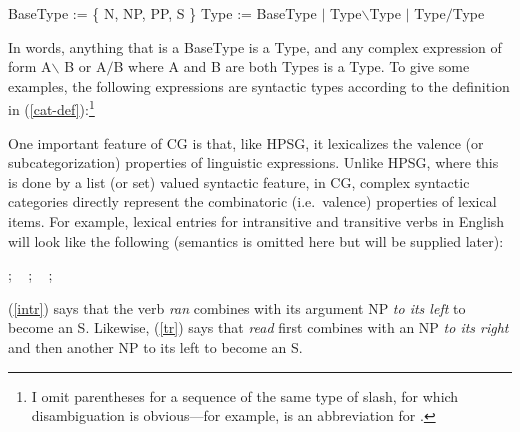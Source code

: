 \documentclass[output=paper]{langsci/langscibook}
\begin{document}
\begin{exe}
 \ex\label{cat-def}
  \begin{xlist}
 \ex\label{bascat}
    BaseType := \{ N,  NP, PP, S \}
 \ex\label{complex-cat}
    Type := BaseType $|$ Type\ensuremath{\backslash}Type $|$ Type\ensuremath{/}Type
  \end{xlist}
\end{exe}
In words, anything that is a BaseType is a Type, and
any complex expression of form A\ensuremath{\backslash} B  or A\ensuremath{/}B where A and B are both
Types is a Type. To give some examples, the following expressions are
syntactic types according to the definition in
(\ref{cat-def}):\footnote{I omit
parentheses for a sequence of the same type of slash, for which
disambiguation is obvious---for example,  is an abbreviation for .}

\begin{exe}
 \ex\label{}
  \begin{xlist}
 \ex\label{}
 \ex\label{}
 \ex\label{}
 \ex\label{}
  \end{xlist}
\end{exe}

One important feature of CG is that, like HPSG, it lexicalizes the
valence (or subcategorization) properties of linguistic expressions.
Unlike HPSG, where this is done by a list (or set) valued syntactic
feature, in CG, complex syntactic categories directly represent the
combinatoric (i.e.~valence) properties of lexical items. For example,
lexical entries for intransitive and transitive verbs in English will
look like the following (semantics is omitted here but will be
supplied later):

\begin{exe}
 \ex\label{lex1}
  \begin{xlist}
 \ex\label{intr}
    ; \  
 \ex\label{tr}
    ; \ 
 \ex\label{tr}
    ; \ 
  \end{xlist}
\end{exe}
(\ref{intr}) says that the verb \textit{ran} combines with its argument NP \emph{to its
left} to become an S. Likewise, (\ref{tr}) says that \textit{read} first
combines with an NP \emph{to its right} and then another NP to its left to
become an S.
\end{document}
